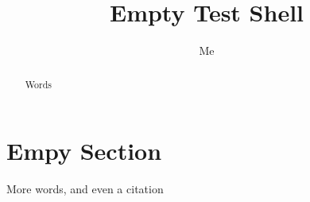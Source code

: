 \documentclass[a4paper,10pt]{article}
\title{Empty Test Shell}
\author{Me}
\begin{document}
\maketitle

\begin{abstract}
Words
\end{abstract}

\section{Empy Section}
More words, and even a citation \cite{Bezanilla2000}


\end{document}
